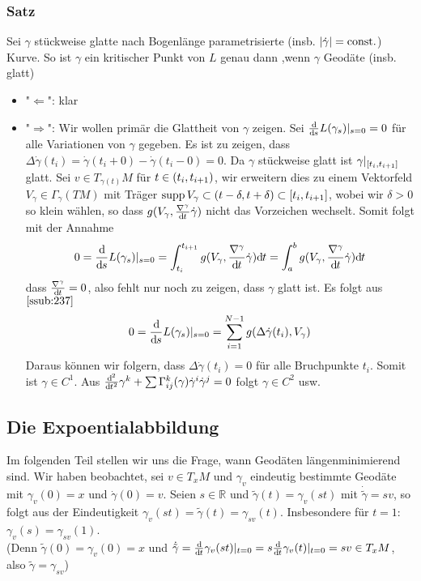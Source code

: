 \subsubsection{Satz}
\label{ssub:242}
Sei $\gamma$  stückweise glatte nach Bogenlänge parametrisierte (insb. $\lvert\dot{\gamma}\rvert = \text{const.}$) Kurve. So ist $\gamma$ ein kritischer Punkt von $L$ genau dann ,wenn $\gamma$ Geodäte (insb. glatt)
\begin{itemize}
\item "$\Leftarrow$": klar
\item "$\Rightarrow$": Wir wollen primär die Glattheit von $\gamma$ zeigen. Sei $\frac{\mathrm{d}\mkern-1.0mu}{\mathrm{d}\mkern-1.0mu s} L(\gamma_s)\vert_{s=0} = 0$ für alle Variationen von $\gamma$ gegeben. Es ist zu zeigen, dass $\Delta \dot{\gamma}(t_i) = \dot{\gamma}(t_i+0) - \dot{\gamma}(t_i-0) = 0$. Da $\gamma$ stückweise glatt ist $\gamma\vert_{[t_i,t_{i+1}]}$ glatt. Sei $v\in T_{\gamma(t)} M$ für $t\in (t_i,t_{i+1})$, wir erweitern dies zu einem Vektorfeld $V_\gamma \in \Gamma_\gamma(TM)$ mit Träger $\operatorname{supp} V_\gamma \subset (t-\delta,t+\delta)\subset [t_i,t_{i+1}]$, wobei wir $\delta > 0$ so klein wählen, so dass $g(V_\gamma,\frac{\nabla^\gamma}{\mathrm{d}\mkern-1.0mu t} \dot{\gamma})$ nicht das Vorzeichen wechselt. Somit folgt mit der Annahme
\[
0 = \frac{\mathrm{d}\mkern-1.0mu}{\mathrm{d}\mkern-1.0mu s} L(\gamma_s)\vert_{s=0} = \int_{t_i}^{t_{i+1}} g(V_\gamma,\frac{\nabla^\gamma}{\mathrm{d}\mkern-1.0mu t} \dot{\gamma}) \mathrm{d}\mkern-1.0mu t = \int_a^b g(V_\gamma,\frac{\nabla^\gamma}{\mathrm{d}\mkern-1.0mu t} \dot{\gamma}) \mathrm{d}\mkern-1.0mu t
\]
dass $\frac{\nabla^\gamma}{\mathrm{d}\mkern-1.0mu t} = 0$, also fehlt nur noch zu zeigen, dass $\gamma$ glatt ist. Es folgt aus $\ref{ssub:237}$
\[
0 = \frac{\mathrm{d}\mkern-1.0mu}{\mathrm{d}\mkern-1.0mu s} L(\gamma_s)\vert_{s=0} = \sum_{i=1}^{N-1} g(\Delta \dot{\gamma}(t_i),V_\gamma)
\]
Daraus können wir folgern, dass $\Delta \dot{\gamma}(t_i) = 0$ für alle Bruchpunkte $t_i$. Somit ist $\gamma \in C^1$. Aus $\frac{\mathrm{d}\mkern-1.0mu^2}{\mathrm{d}\mkern-1.0mu t^2} \gamma^k + \sum \Gamma_{ij}^k(\gamma) \dot{\gamma}^i \dot{\gamma}^j  = 0$ folgt $\gamma \in C^2$ usw.
\end{itemize}


\subsection{Die Expoentialabbildung}
\label{sub:25}
Im folgenden Teil stellen wir uns die Frage, wann Geodäten längenminimierend sind. Wir haben beobachtet, sei $v\in T_x M$ und $\gamma_v$ eindeutig bestimmte Geodäte mit $\gamma_v(0) = x$ und $\dot{\gamma}(0) = v$. Seien $s\in \mathds{R}$ und $\tilde{\gamma}(t) = \gamma_v (st)$ mit $\dot{\tilde{\gamma}} = sv$, so folgt aus der Eindeutigkeit $\gamma_v(st) = \tilde{\gamma}(t) = \gamma_{sv}(t)$. Insbesondere für $t=1$: $\gamma_v(s) = \gamma_{sv}(1)$.\\
(Denn $\tilde{\gamma}(0) = \gamma_v(0) = x$ und $\dot{\tilde{\gamma}} = \frac{\mathrm{d}\mkern-1.0mu}{\mathrm{d}\mkern-1.0mu t} \gamma_{v} (st)\vert_{t=0} = s \frac{\mathrm{d}\mkern-1.0mu}{\mathrm{d}\mkern-1.0mu t} \gamma_{v} (t)\vert_{t=0} = sv \in T_x M$, also $\tilde{\gamma} = \gamma_{sv}$)

